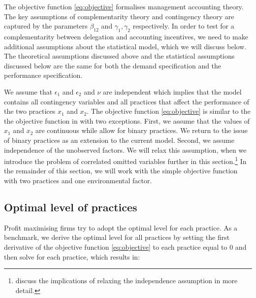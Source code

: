 \documentclass[12pt]{article}
\begin{document}
The objective function \eqref{eq:objective} formalises management accounting theory. The key assumptions of complementarity theory and contingency theory are captured by the parameters $\beta_{12}$ and $\gamma_1, \gamma_2$ respectively. In order to test for a complementarity between delegation and accounting incentives, we need to make additional assumptions about the statistical model, which we will discuss below. The theoretical assumptions discussed above and the statistical assumptions discussed below are the same for both the demand specification and the performance specification.

We assume that $\epsilon_1$ and $\epsilon_2$ and $\nu$ are independent which implies that the model contains all contingency variables and all practices that affect the performance of the two practices $x_1$ and $x_2$. The objective function \eqref{eq:objective} is similar to the the objective function in \citet{kretschmer_competitive_2012} with two exceptions. First, we assume that the values of $x_1$ and $x_2$ are continuous while \citet{kretschmer_competitive_2012} allow for binary practices. We return to the issue of binary practices as an extension to the current model. Second, we assume independence of the unobserved factors. We will relax this assumption, when we introduce the problem of correlated omitted variables further in this section.\footnote{\citet{athey_empirical_1998} discuss the implications of relaxing the independence assumption in more detail.}  In the remainder of this section, we will work with the simple objective function with two practices and one environmental factor. 

\subsection{Optimal level of practices} \label{optimal-level-of-practices}

Profit maximising firms try to adopt the optimal level for each practice. As a benchmark, we derive the optimal level for all practices by setting the first derivative of the objective function \eqref{eq:objective} to each practice equal to $0$ and then solve for each practice, which results in:
\end{document}
